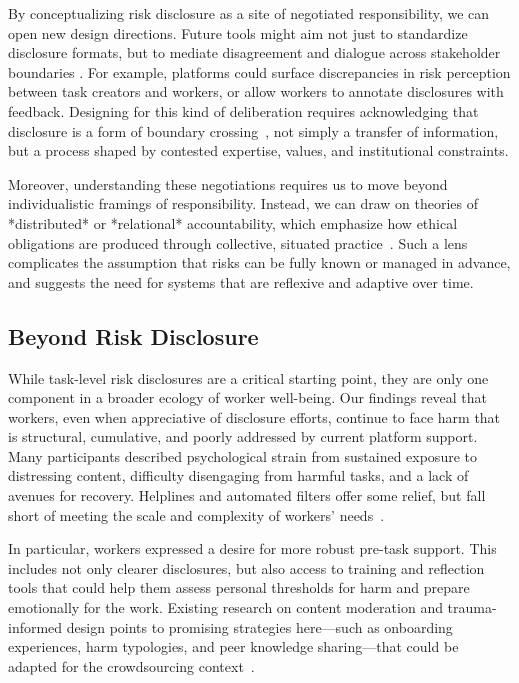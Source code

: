 By conceptualizing risk disclosure as a site of negotiated responsibility, we can open new design directions. Future tools might aim not just to standardize disclosure formats, but to mediate disagreement and dialogue across stakeholder boundaries \cite{fieseler_unfairness_2019}. For example, platforms could surface discrepancies in risk perception between task creators and workers, or allow workers to annotate disclosures with feedback. Designing for this kind of deliberation requires acknowledging that disclosure is a form of boundary crossing~\cite{Suchman2002LocatedAccountabilities}, not simply a transfer of information, but a process shaped by contested expertise, values, and institutional constraints.

Moreover, understanding these negotiations requires us to move beyond individualistic framings of responsibility. Instead, we can draw on theories of *distributed* or *relational* accountability, which emphasize how ethical obligations are produced through collective, situated practice~. Such a lens complicates the assumption that risks can be fully known or managed in advance, and suggests the need for systems that are reflexive and adaptive over time.


\subsection{Beyond Risk Disclosure}
While task-level risk disclosures are a critical starting point, they are only one component in a broader ecology of worker well-being. Our findings reveal that workers, even when appreciative of disclosure efforts, continue to face harm that is structural, cumulative, and poorly addressed by current platform support. Many participants described psychological strain from sustained exposure to distressing content, difficulty disengaging from harmful tasks, and a lack of avenues for recovery. Helplines and automated filters offer some relief, but fall short of meeting the scale and complexity of workers’ needs~.

In particular, workers expressed a desire for more robust pre-task support. This includes not only clearer disclosures, but also access to training and reflection tools that could help them assess personal thresholds for harm and prepare emotionally for the work. Existing research on content moderation and trauma-informed design points to promising strategies here—such as onboarding experiences, harm typologies, and peer knowledge sharing—that could be adapted for the crowdsourcing context~.

